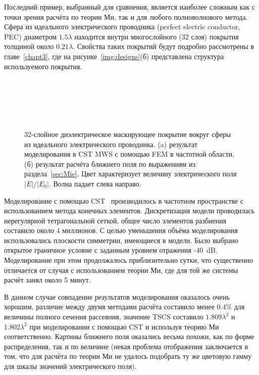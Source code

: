 Последний пример, выбранный для сравнения, является наиболее сложным
как с точки зрения расчёта по теории Ми, так и для любого
полноволнового метода. Сфера из идеального электрического проводника
(perfect electric conductor, PEC) диаметром $1.5\lambda$ находится
внутри многослойного (32 слоя) покрытия толщиной около
$0.21\lambda$. Свойства таких покрытий будут подробно рассмотрены в
главе~\ref{chapt3}, где на рисунке~\ref{img:designs}(б) представлена
структура используемого покрытия.
\begin{figure}[p] 
  \begin{minipage}[ht]{0.99\linewidth}
  \end{minipage}\\
  \vfill
  \begin{minipage}[ht]{0.99\linewidth}
  \end{minipage}\\
  \vfill
  \begin{minipage}[ht]{0.95\linewidth}
  \end{minipage}\\
  \vfill
  \begin{minipage}[ht]{0.99\linewidth}
  \end{minipage}
  \caption{32-слойное диэлектрическое маскирующее покрытие вокруг
    сферы из идеального электрического проводника. (a) результат
    моделирования в CST MWS с помощью FEM в частотной области, (б)
    результат расчёта ближнего поля по выражениям из
    раздела~\ref{sec:Mie}. Цвет характеризует величину электрического
    поля $|E|/|E_0|$. Волна падает слева направо.\label{img:e32layer}}
\end{figure}

Моделирование с помощью CST~\cite{CST-web} производилось в частотном
пространстве с использованием метода конечных элементов. Дискретизация
модели проводилась нерегулярной тетрагональной сеткой, общее число
элементов разбиения составило около 4 миллионов.  С целью уменьшения
объёма моделирования использовались плоскости симметрии, имеющиеся в
модели. Было выбрано открытое граничное условие с заданным уровнем
отражения -40~dB. Моделирование при этом продолжалось приблизительно
сутки, что существенно отличается от случая с использованием теории
Ми, где для той же системы расчёт занял около 5 минут.

В данном случае совпадение результатов моделирования оказалось очень
хорошим, различие между двумя методами расчёта составило менее 0.4\%
для величины полного сечения рассеяния, значение TSCS составило
$1.809\lambda^2$ и $1.802\lambda^2$ при моделировании с помощью CST и
используя теорию Ми соответственно.  Картины ближнего поля оказались
весьма похожи, как по форме распределения, так и по величине (некая
проблема отображения заключается в том, что для расчёта по теории Ми
не удалось подобрать ту же цветовую гамму для шкалы значений
электрического поля).

